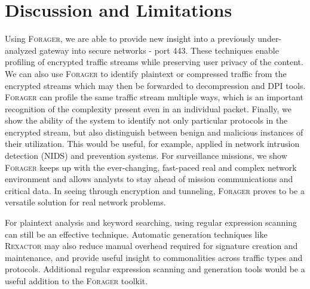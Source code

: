 \section{Discussion and Limitations}

Using \textsc{Forager}, we are able to provide new insight into a previously under-analyzed gateway into secure networks - port 443. These techniques enable profiling of encrypted traffic streams while preserving user privacy of the content. We can also use \textsc{Forager} to identify plaintext or compressed traffic from the encrypted streams which may then be forwarded to decompression and DPI tools. \textsc{Forager} can profile the same traffic stream multiple ways, which is an important recognition of the complexity present even in an individual packet. Finally, we show the ability of the system to identify not only particular protocols in the encrypted stream, but also distinguish between benign and malicious instances of their utilization. This would be useful, for example, applied in network intrusion detection (NIDS) and prevention systems. For surveillance missions, we show \textsc{Forager} keeps up with the ever-changing, fast-paced real and complex network environment and allows analysts to stay ahead of mission communications and critical data. In seeing through encryption and tunneling, \textsc{Forager} proves to be a versatile solution for real network problems.

For plaintext analysis and keyword searching, using regular expression scanning can still be an effective technique. Automatic generation techniques like \textsc{Rexactor} may also reduce manual overhead required for signature creation and maintenance, and provide useful insight to commonalities across traffic types and protocols. Additional regular expression scanning and generation tools would be a useful addition to the \textsc{Forager} toolkit.
